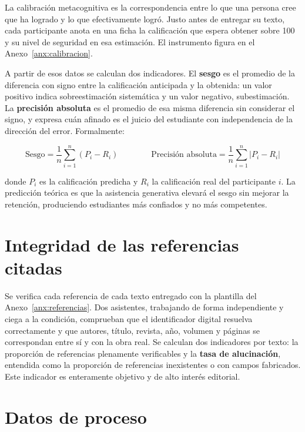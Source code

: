 \documentclass[12pt,a4paper,openany]{report}
\begin{document}
    La calibraci\'on metacognitiva es la correspondencia entre lo que una persona cree que ha logrado y lo que efectivamente logr\'o. Justo antes de entregar su texto, cada participante anota en una ficha la calificaci\'on que espera obtener sobre 100 y su nivel de seguridad en esa estimaci\'on. El instrumento figura en el Anexo~\ref{anx:calibracion}.
    
    A partir de esos datos se calculan dos indicadores. El \textbf{sesgo} es el promedio de la diferencia con signo entre la calificaci\'on anticipada y la obtenida: un valor positivo indica sobreestimaci\'on sistem\'atica y un valor negativo, subestimaci\'on. La \textbf{precisi\'on absoluta} es el promedio de esa misma diferencia sin considerar el signo, y expresa cu\'an afinado es el juicio del estudiante con independencia de la direcci\'on del error. Formalmente:
    
    \begin{equation}
        \text{Sesgo} = \frac{1}{n}\sum_{i=1}^{n}\left(P_i - R_i\right)
        \qquad\qquad
        \text{Precisi\'on absoluta} = \frac{1}{n}\sum_{i=1}^{n}\left|P_i - R_i\right|
    \end{equation}
    
    donde $P_i$ es la calificaci\'on predicha y $R_i$ la calificaci\'on real del participante $i$. La predicci\'on te\'orica es que la asistencia generativa elevar\'a el sesgo sin mejorar la retenci\'on, produciendo estudiantes m\'as confiados y no m\'as competentes.
    
    \section{Integridad de las referencias citadas}
    
    Se verifica cada referencia de cada texto entregado con la plantilla del Anexo~\ref{anx:referencias}. Dos asistentes, trabajando de forma independiente y ciega a la condici\'on, comprueban que el identificador digital resuelva correctamente y que autores, t\'itulo, revista, a\~no, volumen y p\'aginas se correspondan entre s\'i y con la obra real. Se calculan dos indicadores por texto: la proporci\'on de referencias plenamente verificables y la \textbf{tasa de alucinaci\'on}, entendida como la proporci\'on de referencias inexistentes o con campos fabricados. Este indicador es enteramente objetivo y de alto inter\'es editorial.
    
    \section{Datos de proceso}
    
\end{document}
